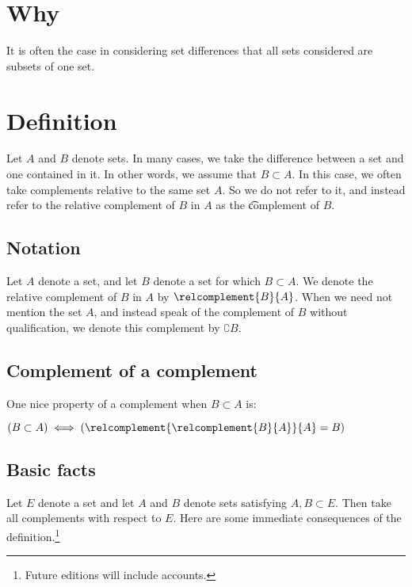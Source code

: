

\section*{Why}

It is often the case in considering set differences that all sets considered are subsets of one set.

\section*{Definition}

Let $A$ and $B$ denote sets.
In many cases, we take the difference between a set and one contained in it.
In other words, we assume that $B \subset A$.
In this case, we often take complements relative to the same set $A$.
So we do not refer to it, and instead refer to the relative complement of $B$ in $A$ as the \t{complement} of $B$.

\subsection*{Notation}

Let $A$ denote a set, and let $B$ denote a set for which $B \subset A$.
We denote the relative complement of $B$ in $A$ by $\relcomplement{B}{A}$.
When we need not mention the set $A$, and instead speak of the complement of $B$ without qualification, we denote this complement by $\complement{B}$.

\subsection*{Complement of a complement}

One nice property of a complement when $B \subset A$ is:
\begin{proposition}
$(B \subset A) \iff (\relcomplement{\relcomplement{B}{A}}{A} = B)$
\end{proposition}


\subsection*{Basic facts}

Let $E$ denote a set and let $A$ and $B$ denote sets satisfying $A,B \subset E$.
Then take all complements with respect to $E$.
Here are some immediate consequences of the definition.\footnote{Future editions will include accounts.}

